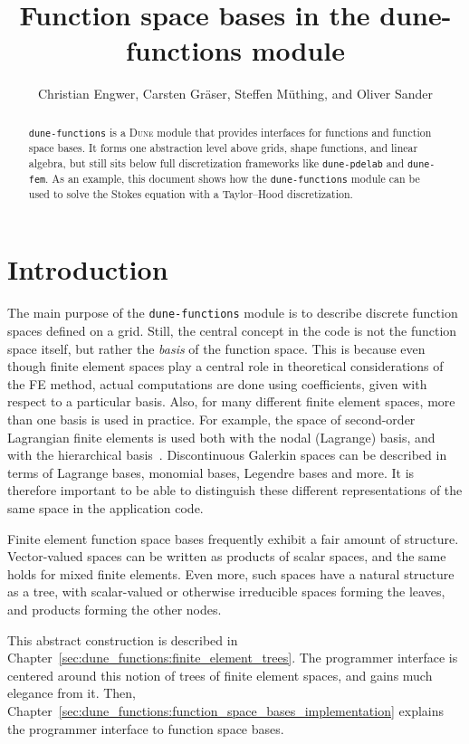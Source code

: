 \documentclass[a4paper,10pt,headings=normal,bibliography=totoc]{scrartcl}
\title{Function space bases in the dune-functions module}
\author{Christian Engwer, Carsten Gräser, Steffen Müthing, and Oliver Sander}
\newcommand{\dune}{\textsc{Dune}\xspace}
\newcommand{\dunemodule}[1]{\texttt{#1}}
\begin{document}
\maketitle

\tableofcontents

\begin{abstract}
 \dunemodule{dune-functions} is a \dune module that provides interfaces for functions and function space bases.
 It forms one abstraction level above grids, shape functions, and linear algebra, but still sits below
 full discretization frameworks like \dunemodule{dune-pdelab} and \dunemodule{dune-fem}.
 As an example, this document shows how the \dunemodule{dune-functions} module can be used to solve the Stokes
 equation with a Taylor--Hood discretization.
\end{abstract}

\section{Introduction}


The main purpose of the \dunemodule{dune-functions} module is to describe discrete function spaces defined on a grid.
Still, the central concept in the code is not the function space itself, but rather the {\em basis} of the function space.
This is because even though finite element spaces play a central role in theoretical considerations of the FE method,
actual computations are done using coefficients, given with respect to a particular basis.  Also,
for many different finite element spaces, more than one basis is used in practice.  For example,
the space of second-order Lagrangian finite elements is used both with the nodal (Lagrange) basis, and with the
hierarchical basis~\cite{bank:1996}.  Discontinuous Galerkin spaces can be described in terms of Lagrange bases,
monomial bases, Legendre bases and more.  It is therefore important to be able to distinguish these different
representations of the same space in the application code.

Finite element function space bases frequently exhibit a fair amount of structure.  Vector-valued spaces can be
written as products of scalar spaces, and the same holds for mixed finite elements.  Even more, such spaces
have a natural structure as a tree, with scalar-valued or otherwise irreducible spaces forming the leaves, and
products forming the other nodes.

This abstract construction is described in Chapter~\ref{sec:dune_functions:finite_element_trees}.
The programmer interface is centered around this notion of trees of finite element spaces, and gains
much elegance from it.
Then, Chapter~\ref{sec:dune_functions:function_space_bases_implementation} explains the programmer interface to function space bases.
\end{document}

